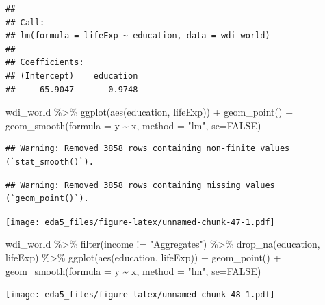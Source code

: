 \documentclass[
]{article}
\newenvironment{Shaded}{\begin{snugshade}}{\end{snugshade}}
\newcommand{\AttributeTok}[1]{\textcolor[rgb]{0.77,0.63,0.00}{#1}}
\newcommand{\ConstantTok}[1]{\textcolor[rgb]{0.00,0.00,0.00}{#1}}
\newcommand{\FunctionTok}[1]{\textcolor[rgb]{0.00,0.00,0.00}{#1}}
\newcommand{\NormalTok}[1]{#1}
\newcommand{\SpecialCharTok}[1]{\textcolor[rgb]{0.00,0.00,0.00}{#1}}
\newcommand{\StringTok}[1]{\textcolor[rgb]{0.31,0.60,0.02}{#1}}
\begin{document}
\begin{verbatim}
## 
## Call:
## lm(formula = lifeExp ~ education, data = wdi_world)
## 
## Coefficients:
## (Intercept)    education  
##     65.9047       0.9748
\end{verbatim}

\begin{Shaded}
\begin{Highlighting}[]
\NormalTok{wdi\_world }\SpecialCharTok{\%\textgreater{}\%} \FunctionTok{ggplot}\NormalTok{(}\FunctionTok{aes}\NormalTok{(education, lifeExp)) }\SpecialCharTok{+} \FunctionTok{geom\_point}\NormalTok{() }\SpecialCharTok{+} \FunctionTok{geom\_smooth}\NormalTok{(}\AttributeTok{formula =}\NormalTok{ y }\SpecialCharTok{\textasciitilde{}}\NormalTok{ x, }\AttributeTok{method =} \StringTok{"lm"}\NormalTok{, }\AttributeTok{se=}\ConstantTok{FALSE}\NormalTok{)}
\end{Highlighting}
\end{Shaded}

\begin{verbatim}
## Warning: Removed 3858 rows containing non-finite values (`stat_smooth()`).
\end{verbatim}

\begin{verbatim}
## Warning: Removed 3858 rows containing missing values (`geom_point()`).
\end{verbatim}

\texttt{[image: eda5\_files/figure-latex/unnamed-chunk-47-1.pdf]}

\begin{Shaded}
\begin{Highlighting}[]
\NormalTok{wdi\_world }\SpecialCharTok{\%\textgreater{}\%} \FunctionTok{filter}\NormalTok{(income }\SpecialCharTok{!=} \StringTok{"Aggregates"}\NormalTok{) }\SpecialCharTok{\%\textgreater{}\%} \FunctionTok{drop\_na}\NormalTok{(education, lifeExp) }\SpecialCharTok{\%\textgreater{}\%} \FunctionTok{ggplot}\NormalTok{(}\FunctionTok{aes}\NormalTok{(education, lifeExp)) }\SpecialCharTok{+} \FunctionTok{geom\_point}\NormalTok{() }\SpecialCharTok{+} \FunctionTok{geom\_smooth}\NormalTok{(}\AttributeTok{formula =}\NormalTok{ y }\SpecialCharTok{\textasciitilde{}}\NormalTok{ x, }\AttributeTok{method =} \StringTok{"lm"}\NormalTok{, }\AttributeTok{se=}\ConstantTok{FALSE}\NormalTok{)}
\end{Highlighting}
\end{Shaded}

\texttt{[image: eda5\_files/figure-latex/unnamed-chunk-48-1.pdf]}
\end{document}

